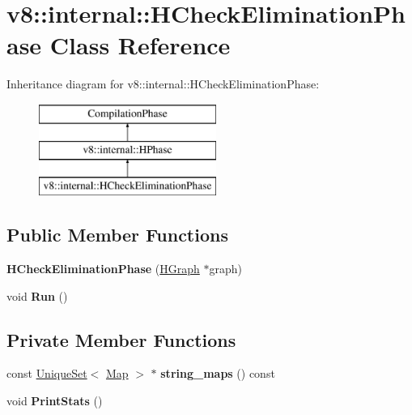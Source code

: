 \hypertarget{classv8_1_1internal_1_1_h_check_elimination_phase}{}\section{v8\+:\+:internal\+:\+:H\+Check\+Elimination\+Phase Class Reference}
\label{classv8_1_1internal_1_1_h_check_elimination_phase}
Inheritance diagram for v8\+:\+:internal\+:\+:H\+Check\+Elimination\+Phase\+:\begin{figure}[H]
\begin{center}
\leavevmode
\includegraphics[height=3.000000cm]{classv8_1_1internal_1_1_h_check_elimination_phase}
\end{center}
\end{figure}
\subsection*{Public Member Functions}
\begin{DoxyCompactItemize}
\item 
{\bfseries H\+Check\+Elimination\+Phase} (\hyperlink{classv8_1_1internal_1_1_h_graph}{H\+Graph} $\ast$graph)\hypertarget{classv8_1_1internal_1_1_h_check_elimination_phase_ad634c6666701fcdb402546f6b4526314}{}\label{classv8_1_1internal_1_1_h_check_elimination_phase_ad634c6666701fcdb402546f6b4526314}

\item 
void {\bfseries Run} ()\hypertarget{classv8_1_1internal_1_1_h_check_elimination_phase_a5072143ff4e3fafbe6ab762551e35c3f}{}\label{classv8_1_1internal_1_1_h_check_elimination_phase_a5072143ff4e3fafbe6ab762551e35c3f}

\end{DoxyCompactItemize}
\subsection*{Private Member Functions}
\begin{DoxyCompactItemize}
\item 
const \hyperlink{classv8_1_1internal_1_1_unique_set}{Unique\+Set}$<$ \hyperlink{classv8_1_1internal_1_1_map}{Map} $>$ $\ast$ {\bfseries string\+\_\+maps} () const \hypertarget{classv8_1_1internal_1_1_h_check_elimination_phase_abfc97a999d523920356dcbb64c24e124}{}\label{classv8_1_1internal_1_1_h_check_elimination_phase_abfc97a999d523920356dcbb64c24e124}

\item 
void {\bfseries Print\+Stats} ()\hypertarget{classv8_1_1internal_1_1_h_check_elimination_phase_a7b0bfdf996461805525d23033fb9ccbd}{}\label{classv8_1_1internal_1_1_h_check_elimination_phase_a7b0bfdf996461805525d23033fb9ccbd}

\end{DoxyCompactItemize}
